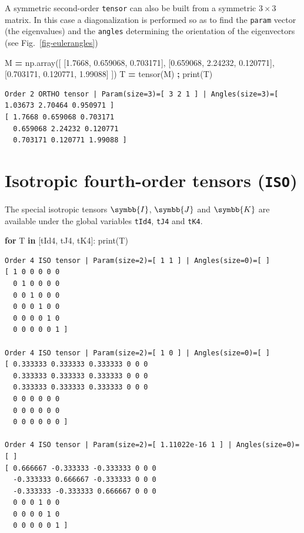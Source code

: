 \documentclass[
  a4paper,
  numbers=noendperiod,
  DIV=12]{scrreprt}
\newenvironment{Shaded}{\begin{snugshade}}{\end{snugshade}}
\newcommand{\BuiltInTok}[1]{#1}
\newcommand{\ControlFlowTok}[1]{\textcolor[rgb]{0.13,0.29,0.53}{\textbf{#1}}}
\newcommand{\FloatTok}[1]{\textcolor[rgb]{0.00,0.00,0.81}{#1}}
\newcommand{\KeywordTok}[1]{\textcolor[rgb]{0.13,0.29,0.53}{\textbf{#1}}}
\newcommand{\NormalTok}[1]{#1}
\newcommand{\OperatorTok}[1]{\textcolor[rgb]{0.81,0.36,0.00}{\textbf{#1}}}
\newcommand{\uuuu}[1]{{\symbb{{#1}}}}
\begin{document}
A symmetric second-order \texttt{tensor} can also be built from a
symmetric \(3×3\) matrix. In this case a diagonalization is performed so
as to find the \texttt{param} vector (the eigenvalues) and the
\texttt{angles} determining the orientation of the eigenvectors (see
Fig.~\ref{fig-eulerangles})

\begin{Shaded}
\begin{Highlighting}[]
\NormalTok{M }\OperatorTok{=}\NormalTok{ np.array([ [}\FloatTok{1.7668}\NormalTok{, }\FloatTok{0.659068}\NormalTok{, }\FloatTok{0.703171}\NormalTok{], }
\NormalTok{               [}\FloatTok{0.659068}\NormalTok{, }\FloatTok{2.24232}\NormalTok{, }\FloatTok{0.120771}\NormalTok{], }
\NormalTok{               [}\FloatTok{0.703171}\NormalTok{, }\FloatTok{0.120771}\NormalTok{, }\FloatTok{1.99088}\NormalTok{] ])}
\NormalTok{T }\OperatorTok{=}\NormalTok{ tensor(M) }\OperatorTok{;} \BuiltInTok{print}\NormalTok{(T)}
\end{Highlighting}
\end{Shaded}

\begin{verbatim}
Order 2 ORTHO tensor | Param(size=3)=[ 3 2 1 ] | Angles(size=3)=[ 1.03673 2.70464 0.950971 ]
[ 1.7668 0.659068 0.703171 
  0.659068 2.24232 0.120771 
  0.703171 0.120771 1.99088 ]
\end{verbatim}

\section{\texorpdfstring{Isotropic fourth-order tensors
(\texttt{ISO})}{Isotropic fourth-order tensors (ISO)}}\label{isotropic-fourth-order-tensors-iso}

The special isotropic tensors \(\uuuu{I}\), \(\uuuu{J}\) and
\(\uuuu{K}\) are available under the global variables \texttt{tId4},
\texttt{tJ4} and \texttt{tK4}.

\begin{Shaded}
\begin{Highlighting}[]
\ControlFlowTok{for}\NormalTok{ T }\KeywordTok{in}\NormalTok{ [tId4, tJ4, tK4]:}
    \BuiltInTok{print}\NormalTok{(T)}
\end{Highlighting}
\end{Shaded}

\begin{verbatim}
Order 4 ISO tensor | Param(size=2)=[ 1 1 ] | Angles(size=0)=[ ]
[ 1 0 0 0 0 0 
  0 1 0 0 0 0 
  0 0 1 0 0 0 
  0 0 0 1 0 0 
  0 0 0 0 1 0 
  0 0 0 0 0 1 ]

Order 4 ISO tensor | Param(size=2)=[ 1 0 ] | Angles(size=0)=[ ]
[ 0.333333 0.333333 0.333333 0 0 0 
  0.333333 0.333333 0.333333 0 0 0 
  0.333333 0.333333 0.333333 0 0 0 
  0 0 0 0 0 0 
  0 0 0 0 0 0 
  0 0 0 0 0 0 ]

Order 4 ISO tensor | Param(size=2)=[ 1.11022e-16 1 ] | Angles(size=0)=[ ]
[ 0.666667 -0.333333 -0.333333 0 0 0 
  -0.333333 0.666667 -0.333333 0 0 0 
  -0.333333 -0.333333 0.666667 0 0 0 
  0 0 0 1 0 0 
  0 0 0 0 1 0 
  0 0 0 0 0 1 ]
\end{verbatim}
\end{document}
